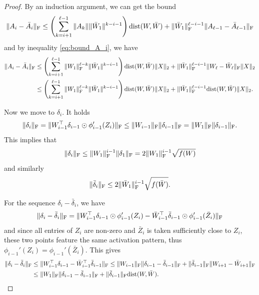 \documentclass[a4paper,11pt]{article}
\newcommand{\1}{\mathbbm{1}}
\theoremstyle{plain}
\begin{document}
\begin{proof}
By an induction argument, we can get the bound
\begin{equation*}
    \|A_i-\bar A_i\|_{\rm F} \leq \left(\sum_{k=i+1}^{\ell-1} \|A_k\| \|\bar W_1\|^{k-i-1}\right) \textnormal{dist}(W,\bar W) + \|\bar W_1\|_{\rm F}^{\ell-i-1} \|A_{\ell-1}-\bar A_{\ell-1} \|_{\rm F}
\end{equation*}
and by inequality \eqref{eq:bound_A_i}, we have
\begin{align}
\label{eq:A_i-barA_i}
     \|A_i-\bar A_i\|_{\rm F} & \leq \nonumber \left(\sum_{k=i+1}^{\ell-1} \|W_1\|_{\rm F}^{\ell-k} \|\bar W_1\|^{k-i-1}\right) \textnormal{dist}(W,\bar W) \|X\|_2 + \|\bar W_1\|_{\rm F}^{\ell-i-1} \|W_{\ell}-\bar W_{\ell}\|_{\rm F} \|X\|_2 \\ & \leq \left(\sum_{k=i+1}^{\ell-1} \|W_1\|_{\rm F}^{\ell-k} \|\bar W_1\|^{k-i-1}\right) \textnormal{dist}(W,\bar W) \|X\|_2 + \|\bar W_1\|_{\rm F}^{\ell-i-1} \textnormal{dist}(W,\bar W) \|X\|_2.
\end{align}

Now we move to $\delta_i$. It holds
\begin{equation*}
    \|\delta_i\|_{\rm F} = \|W_{i-1}^\top \delta_{i-1} \odot \phi_{i-1}'(Z_i)\|_{\rm F} \leq \|W_{i-1}\|_{\rm F} \|\delta_{i-1}\|_{\rm F} = \|W_1\|_{\rm F} \|\delta_{i-1}\|_{\rm F}.
\end{equation*}
This implies that
\begin{equation*}
     \|\delta_i\|_{\rm F} \leq \|W_1\|_{\rm F}^{i-1} \|\delta_1\|_{\rm F} = 2 \|W_1\|_{\rm F}^{i-1} \sqrt{f(W)}
\end{equation*}
and similarly
\begin{equation}
\label{eq:bar_delta}
    \|\bar \delta_i\|_{\rm F} \leq 2 \|\bar W_1\|_{\rm F}^{i-1} \sqrt{f(\bar W)}.
\end{equation}

For the sequence $\delta_i-\bar \delta_i$, we have
\begin{align*}
    \|\delta_i - \bar \delta_i\|_{\rm F} = \| W_{i-1}^\top \delta_{i-1} \odot \phi_{i-1}'(Z_i) - \bar W_{i-1}^\top \bar \delta_{i-1} \odot \phi_{i-1}'(\bar Z_i)\|_{\rm F}
\end{align*}
and since all entries of $Z_i$ are non-zero and $\bar Z_i$ is taken sufficiently close to $Z_i$, these two points feature the same activation pattern, thus $\phi_{i-1}'(Z_i) = \phi_{i-1}'(\bar Z_i)$. This gives
\begin{align*}
    \|\delta_i - \bar \delta_i\|_{\rm F} & \leq \| W_{i-1}^\top \delta_{i-1} - \bar W_{i-1}^\top \bar \delta_{i-1}\|_{\rm F} \leq \|W_{i-1}\|_{\rm F} \| \delta_{i-1}-\bar \delta_{i-1}\|_{\rm F} + \|\bar \delta_{i-1}\|_{\rm F} \|W_{i+1}-\bar W_{i+1}\|_{\rm F} 
 \\ &\leq \|W_1\|_{\rm F} \| \delta_{i-1}-\bar \delta_{i-1}\|_{\rm F} + \|\bar \delta_{i-1}\|_{\rm F} \textnormal{dist}(W,\bar W).
\end{align*}


\end{proof}
\end{document}
